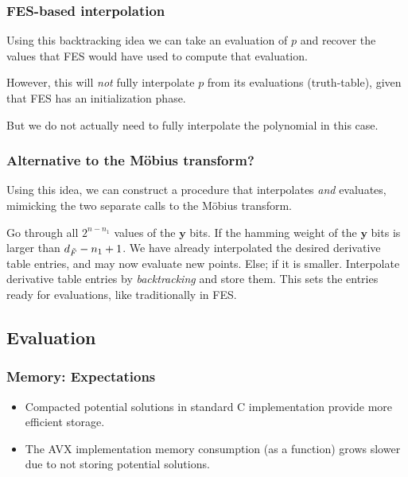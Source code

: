 \documentclass{beamer}
\begin{document}
\begin{frame}
    \frametitle{FES-based interpolation}
    Using this backtracking idea we can take an evaluation of $p$ and recover the values that FES would have used to compute that evaluation.

    \pause 

    However, this will \textit{not} fully interpolate $p$ from its evaluations (truth-table), given that FES has an initialization phase.

    \pause

    But we do not actually need to fully interpolate the polynomial in this case.
\end{frame}

\begin{frame}
    \frametitle{Alternative to the Möbius transform?}
    Using this idea, we can construct a procedure that interpolates \textit{and} evaluates, mimicking the two separate calls to the Möbius transform.

    \begin{outline}
        \1 Go through all $2^{n - n_1}$ values of the $\mathbf{y}$ bits.
            \2 If the hamming weight of the $\mathbf{y}$ bits is larger than $d_{\Tilde{F}} - n_1 + 1$.
                \3 We have already interpolated the desired derivative table entries, and may now evaluate new points.
            \2 Else; if it is smaller.
                \3 Interpolate derivative table entries by \textit{backtracking} and store them. This sets the entries ready for evaluations, like traditionally in FES.
    \end{outline}
\end{frame}

\subsection{Evaluation}
\begin{frame}
    \frametitle{Memory: Expectations}
    \begin{itemize}
        \item Compacted potential solutions in standard C implementation provide more efficient storage.
        \item The AVX implementation memory consumption (as a function) grows slower due to not storing potential solutions.
    \end{itemize}
\end{frame}
\end{document}
